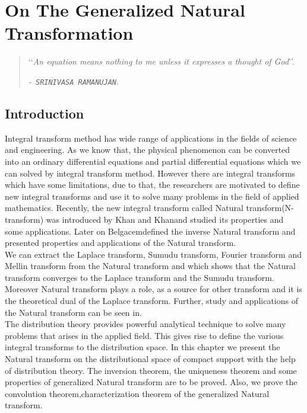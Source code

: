 
\chapter{On The Generalized Natural Transformation}
\begin{quote}
\textcolor[rgb]{0.25,0.40,0.60}{\lq\lq\textsl{An equation means nothing to
me unless it expresses a thought of God}\rq\rq}.
\begin{flushright}
\textcolor[rgb]{0.55,0.00,0.55}{\em-\texttt{ SRINIVASA RAMANUJAN}}.
\end{flushright}
\end{quote}

\section{Introduction}
Integral transform method has wide range of applications in the fields of science and engineering. As we know that, the physical phenomenon can be converted into an ordinary differential equations and partial differential equations which we can solved by integral transform method. However there are integral transforms which have some limitations, due to that, the researchers are motivated to define new integral transforms and use it to solve many problems in the field of applied mathematics. Recently, the new integral transform called Natural transform(N-transform) was introduced by Khan and Khan\cite{R51}and studied its properties and some applications. Later on Belgacem\cite{R13,R14}defined the inverse Natural transform and presented properties and applications of the Natural transform.\\
We can extract the Laplace transform, Sumudu transform, Fourier transform and Mellin transform from the Natural transform and which shows that the Natural transform converges to the Laplace transform and the Sumudu transform\cite{R50}. Moreover Natural transform plays a role, as a source for other transform and it is the theoretical dual of the Laplace transform. Further, study and applications of the Natural transform can be seen in\cite{R12,R24,R25,R31}.\\
The distribution theory provides powerful analytical technique to solve many problems that arises in the applied field. This gives rise to define the various integral transforms to the distribution space\cite{R30,R32,R33,R34,R72,R73,R81}. In this chapter we present the Natural transform on the distributional space of compact support with the help of distribution theory. The inversion theorem, the uniqueness theorem and some properties of generalized Natural transform are to be proved. Also, we prove the convolution theorem,characterization theorem of the generalized Natural transform.
